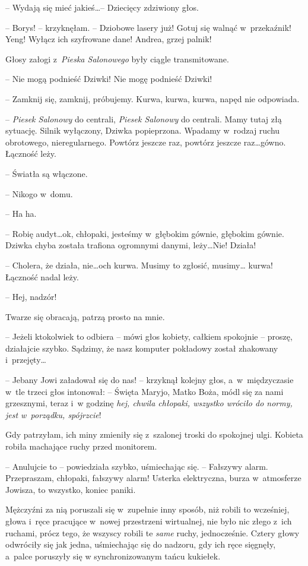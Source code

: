 \documentclass[oneside,polish,11pt,sfheadings]{mwbk}
\begin{document}
-- Wydają się mieć jakieś\ldots  -- Dziecięcy zdziwiony głos.

-- Borys! -- krzyknęłam. -- Dziobowe lasery już! Gotuj się walnąć w~przekaźnik! Yeng! Wyłącz ich szyfrowane dane! Andrea, grzej palnik!

Głosy załogi z~\textit{Pieska Salonowego} były ciągle transmitowane.

-- Nie mogą podnieść Dziwki! Nie mogę podnieść Dziwki!

-- Zamknij się, zamknij, próbujemy. Kurwa, kurwa, kurwa, napęd nie
odpowiada.

-- \textit{Piesek Salonowy }do centrali, \textit{Piesek Salonowy} do
centrali. Mamy tutaj złą sytuację. Silnik wyłączony, Dziwka popieprzona.
Wpadamy w~rodzaj ruchu obrotowego, nieregularnego. Powtórz jeszcze raz,
powtórz jeszcze raz\ldots  gówno. Łączność leży.

-- Światła są włączone.

-- Nikogo w~domu.

-- Ha ha.

-- Robię audyt\ldots  ok, chłopaki, jesteśmy w~głębokim gównie, głębokim
gównie. Dziwka chyba została trafiona ogromnymi danymi, leży\ldots  Nie!
Działa!

-- Cholera, że działa, nie\ldots  och kurwa. Musimy to zgłosić, musimy\ldots 
kurwa! Łączność nadal leży.

-- Hej, nadzór!

Twarze się obracają, patrzą prosto na mnie.

-- Jeżeli ktokolwiek to odbiera -- mówi głos kobiety, całkiem spokojnie -- proszę, działajcie szybko. Sądzimy, że nasz komputer pokładowy został
zhakowany i~przejęty\ldots 

-- Jebany Jowi załadował się do nas! -- krzyknął kolejny głos, a~w~międzyczasie w~tle trzeci głos intonował: -- Święta Maryjo, Matko Boża,
módl się za nami grzesznymi, teraz i~w godzinę \textit{hej, chwila
chłopaki, wszystko wróciło do normy, jest w~porządku, spójrzcie}!

Gdy patrzyłam, ich miny zmieniły się z~szalonej troski do spokojnej
ulgi. Kobieta robiła machające ruchy przed monitorem.

-- Anulujcie to -- powiedziała szybko, uśmiechając się. -- Fałszywy alarm.
Przepraszam, chłopaki, fałszywy alarm! Usterka elektryczna, burza w~atmosferze Jowisza, to wszystko, koniec paniki.

Mężczyźni za nią poruszali się w~zupełnie inny sposób, niż robili to
wcześniej, głowa i~ręce pracujące w~nowej przestrzeni wirtualnej, nie
było nic złego z~ich ruchami, prócz tego, że wszyscy robili te
\textit{same} ruchy, jednocześnie. Cztery głowy odwróciły się jak jedna,
uśmiechając się do nadzoru, gdy ich ręce sięgnęły, a~palce poruszyły się
w synchronizowanym tańcu kukiełek.
\end{document}
